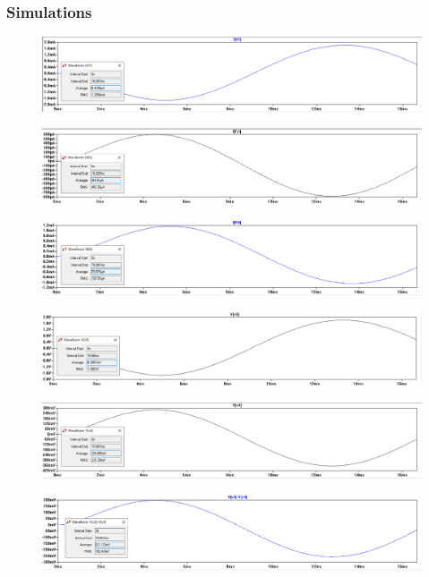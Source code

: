 \documentclass[letterpaper]{article}
\begin{document}
\subsubsection{Simulations}
\begin{figure}[H]
    \centering
    \includegraphics[width=\linewidth]{mesh-i1}
\end{figure}
\begin{figure}[H]
    \centering
    \includegraphics[width=\linewidth]{mesh-i2}
\end{figure}
\begin{figure}[H]
    \centering
    \includegraphics[width=\linewidth]{mesh-i3}
\end{figure}
\begin{figure}[H]
    \centering
    \includegraphics[width=\linewidth]{mesh-vr1}
\end{figure}
\begin{figure}[H]
    \centering
    \includegraphics[width=\linewidth]{mesh-vr2}
\end{figure}
\begin{figure}[H]
    \centering
    \includegraphics[width=\linewidth]{mesh-vr3}
\end{figure}
\end{document}
